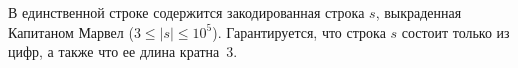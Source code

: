В единственной строке содержится закодированная строка $s$, выкраденная Капитаном Марвел ($3 \le |s| \le 10^5$). Гарантируется, что строка $s$ состоит только из цифр, а также что ее длина кратна~$3$.